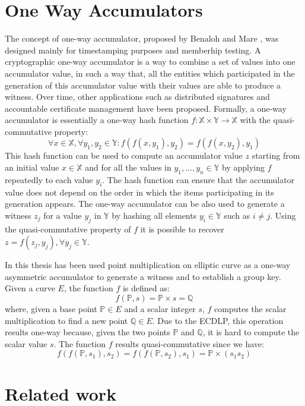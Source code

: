 \section{One Way Accumulators}
The concept of one-way accumulator, proposed by Benaloh and Mare \cite{10.1007/3-540-48285-7_24}, was designed mainly for timestamping purposes and memberhip testing. 
A cryptographic one-way accumulator is a way to combine a set of values into one accumulator value, in such a way that, all the entities which participated in the generation of this accumulator value with their values are able to produce a witness.
Over time, other applications such as distributed signatures and accountable certificate management \cite{Buldas2004AccountableAttestations} have been proposed.
Formally, a one-way accumulator is essentially a one-way hash function $f : \mathbb{X} \times \mathbb{Y} \xrightarrow{} \mathbb{X}$ with the quasi-commutative property:
\begin{equation}
    \forall x \in \mathbb{X}, \forall y_1,y_2 \in \mathbb{Y} : f(f(x,y_1), y_2) = f(f(x,y_2), y_1)
\end{equation}
This hash function can be used to compute an accumulator value $z$ starting from an initial value $x \in \mathbb{X}$ and for all the values in $y_1,...,y_n \in \mathbb{Y}$ by applying $f$ repeatedly to each value $y_i$. 
The hash function can ensure that the accumulator value does not depend on the order in which the items participating in its generation appears.
The one-way accumulator can be also used  to generate a witness $z_j$ for a value $y_j$ in $\mathbb{Y}$ by hashing all elements $y_i \in \mathbb{Y}$ such as $i \neq j$. 
Using the quasi-commutative property of $f$ it is possible to recover $z = f(z_j,y_j), \forall y_j \in \mathbb{Y}$.

In this thesis has been used point multiplication on elliptic curve as a one-way asymmetric accumulator to generate a witness and to establish a group key.
Given a curve $E$, the function $f$ is defined as:
\begin{equation}
    f(\mathbb{P},s) = \mathbb{P} \times s = \mathbb{Q}
\end{equation}
where, given a base point $\mathbb{P} \in E$ and a scalar integer $s$, $f$ computes the scalar multiplication to find a new point $\mathbb{Q} \in E$. Due to the ECDLP, this operation results one-way because, given the two points $\mathbb{P}$ and $\mathbb{Q}$, it is hard to compute the scalar value $s$. 
The function $f$ results quasi-commutative since we have:
\begin{equation}
    f(f(\mathbb{P},s_1),s_2) = f(f(\mathbb{P},s_2),s_1) = \mathbb{P} \times (s_1 s_2) 
\end{equation}



\section{Related work}






